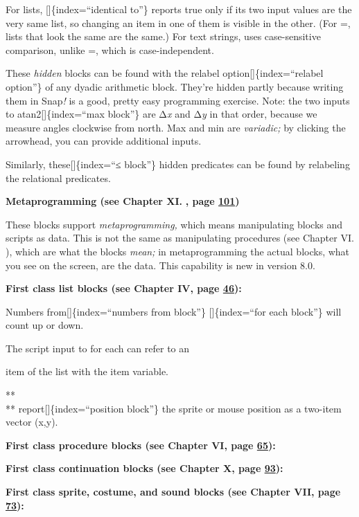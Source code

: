 \documentclass[
  letterpaper,
]{book}
\begin{document}
For lists, {[}{]}\{index=``identical to''\} reports true only if its two
input values are the very same list, so changing an item in one of them
is visible in the other. (For =, lists that look the same are the same.)
For text strings, uses case-sensitive comparison, unlike =, which is
case-independent.

These \emph{hidden} blocks can be found with the relabel
option{[}{]}\{index=``relabel option''\} of any dyadic arithmetic block.
They're hidden partly because writing them in Snap\emph{!} is a good,
pretty easy programming exercise. Note: the two inputs to
atan2{[}{]}\{index=``max block''\} are Δ\emph{x} and Δ\emph{y} in that
order, because we measure angles clockwise from north. Max and min are
\emph{variadic;} by clicking the arrowhead, you can provide additional
inputs.

Similarly, these{[}{]}\{index=``≤ block''\} hidden predicates can be
found by relabeling the relational predicates.

\textbf{Metaprogramming (see Chapter XI.} \textbf{, page
\hyperref[metaprogramming]{101})}

These blocks support \emph{metaprogramming,} which means manipulating
blocks and scripts as data. This is not the same as manipulating
procedures (see Chapter VI. ), which are what the blocks \emph{mean;} in
metaprogramming the actual blocks, what you see on the screen, are the
data. This capability is new in version 8.0.

\textbf{First class list blocks (see Chapter IV, page
\hyperref[first-class-lists]{46}):}

Numbers from{[}{]}\{index=``numbers from block''\} {[}{]}\{index=``for
each block''\} will count up or down.

The script input to for each can refer to an

item of the list with the item variable.

**\\
** report{[}{]}\{index=``position block''\} the sprite or mouse position
as a two-item vector (x,y).

\textbf{First class procedure blocks (see Chapter VI, page
\hyperref[procedures-as-data]{65}):}

\textbf{First class continuation blocks (see Chapter X, page
\hyperref[continuations]{93}):}

\textbf{First class sprite, costume, and sound blocks (see Chapter VII,
page \hyperref[object-oriented-programming-with-sprites]{73}):}
\end{document}

